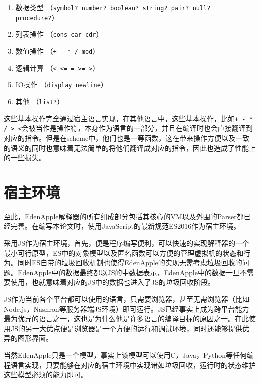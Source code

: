 \begin{enumerate}
\item 数据类型 （\texttt{symbol? number? boolean? string? pair? null? procedure?}）
\item 列表操作 （\texttt{cons car cdr}）
\item 数值操作 （\texttt{+ - * / mod}）
\item 逻辑计算 （\texttt{< <= = >= >}）
\item IO操作 （\texttt{display newline}）
\item 其他 （\texttt{list?}）
\end{enumerate}

这些基本操作完全通过宿主语言实现，在其他语言中，这些基本操作，比如\texttt{+ - * / > <}会被当作是操作符，本身作为语言的一部分，并且在编译时也会直接翻译到对应的指令。但是在scheme中，他们也是一等函数，这在带来操作方便以及一致的语义的同时也意味着无法简单的将他们翻译成对应的指令，因此也造成了性能上的一些损失。

\section{宿主环境}

至此，EdenApple解释器的所有组成部分包括其核心的VM以及外围的Parser都已经完善。在编写本论文时，使用JavaScript的最新规范ES2016作为宿主环境。

采用JS作为宿主环境，首先，便是程序编写便利，可以快速的实现解释器的一个最小可行原型，ES中的对象模型以及匿名函数可以方便的管理虚拟机的状态和行为。同时ES自带的垃圾回收机制也使得EdenApple的实现无需考虑垃圾回收的问题。EdenApple中的数据最终都以JS的中数据表示，EdenApple中的数据一旦不需要使用，也就意味着对应的JS中的数据也进入了JS的垃圾回收阶段。

JS作为当前各个平台都可以使用的语言，只需要浏览器，甚至无需浏览器（比如Node.js，Nashron等服务器端JS环境）即可运行。JS已经事实上成为跨平台能力最为优异的语言之一，这也是为什么他是许多语言的编译目标的原因之一。在此使用JS的另一大优点便是浏览器是一个方便的运行和调试环境，同时还能够提供优异的图形界面。

当然EdenApple只是一个模型，事实上该模型可以使用C，Java，Python等任何编程语言实现，只要能够在对应的宿主环境中实现诸如垃圾回收，运行时的状态维护这些模型必须的能力即可。